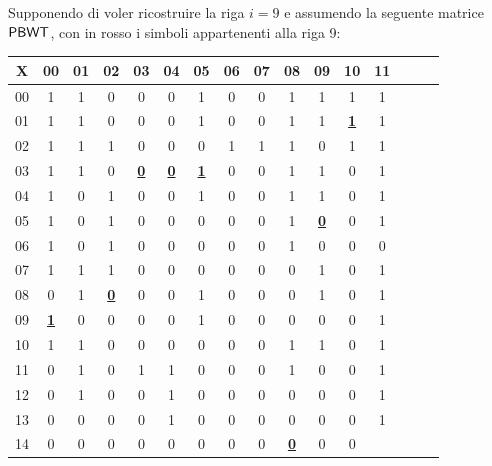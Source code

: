 \begin{esempio}
   Supponendo di voler ricostruire la riga $i=9$ e assumendo la seguente matrice
   $\mbox{\rm {\sf PBWT}}$, con in rosso i simboli appartenenti alla riga 9: 
   \begin{table}[H]
     \centering
     \scriptsize
     \begin{tabular}{c|ccccccccccccccc}
       X & 00 & 01 & 02 & 03 & 04 & 05 & 06 & 07 & 08 & 09 & 10 & 11 \\
       \hline
       00 & 1 & 1 & 0 & 0 & 0 & 1 & 0 & 0 & 1 & 1 & 1 & 1 \\
       01 & 1 & 1 & 0 & 0 & 0 & 1 & 0 & 0 & 1 & 1 & {\color{nordred}\textbf{\underline{1}}}
                                                                & 1 \\
       02 & 1 & 1 & 1 & 0 & 0 & 0 & 1 & 1 & 1 & 0 & 1 & 1 \\
       03 & 1 & 1 & 0 & {\color{nordred}\textbf{\underline{0}}} & {\color{nordred}\textbf{\underline{0}}}
                                  & {\color{nordred}\textbf{\underline{1}}} & 0 & 0 & 1 & 1
                                                           & 0 & 1 \\
       04 & 1 & 0 & 1 & 0 & 0 & 1 & 0 & 0 & 1 & 1 & 0 & 1 \\
       05 & 1 & 0 & 1 & 0 & 0 & 0 & 0 & 0 & 1 & {\color{nordred}\textbf{\underline{0}}} & 0
                                                                & 1 \\
       06 & 1 & 0 & 1 & 0 & 0 & 0 & 0 & 0 & 1 & 0 & 0 & 0 \\
       07 & 1 & 1 & 1 & 0 & 0 & 0 & 0 & 0 & 0 & 1 & 0 & 1 \\
       08 & 0 & 1 & {\color{nordred}\textbf{\underline{0}}} & 0 & 0 & 1 & 0 & 0 & 0 & 1 & 0
                                                                & 1 \\
       09 & {\color{nordred}\textbf{\underline{1}}} & 0 & 0 & 0 & 0 & 1 & 0 & 0 & 0 & 0 & 0
                                                                & 1 \\
       10 & 1 & 1 & 0 & 0 & 0 & 0 & 0 & 0 & 1 & 1 & 0 & 1 \\
       11 & 0 & 1 & 0 & 1 & 1 & 0 & 0 & 0 & 1 & 0 & 0 & 1 \\
       12 & 0 & 1 & 0 & 0 & 1 & 0 & 0 & 0 & 0 & 0 & 0 & 1 \\
       13 & 0 & 0 & 0 & 0 & 1 & 0 & 0 & 0 & 0 & 0 & 0 & 1 \\
       14 & 0 & 0 & 0 & 0 & 0 & 0 & 0 & 0 & {\color{nordred}\textbf{\underline{0}}} & 0 & 0

\end{tabular}
\end{table}
\end{esempio}

